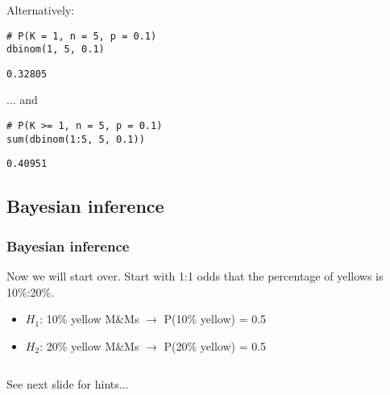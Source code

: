 \documentclass[11pt,containsverbatim,handout,xcolor=xelatex,dvipsnames,table]{beamer}
\begin{document}

\begin{frame}[fragile]
\frametitle{}

Alternatively: \\
\pause
{\footnotesize
\begin{Verbatim}[frame=single, formatcom=\color{blue}]
# P(K = 1, n = 5, p = 0.1) 
dbinom(1, 5, 0.1)
\end{Verbatim}
}
{\footnotesize
\begin{Verbatim}[frame=single, formatcom=\color{gray}]
0.32805
\end{Verbatim}
}

... and

\pause
{\footnotesize
\begin{Verbatim}[frame=single, formatcom=\color{blue}]
# P(K >= 1, n = 5, p = 0.1) 
sum(dbinom(1:5, 5, 0.1))
\end{Verbatim}
}
{\footnotesize
\begin{Verbatim}[frame=single, formatcom=\color{gray}]
0.40951
\end{Verbatim}
}


\end{frame}


\subsection{Bayesian inference}


\begin{frame}
\frametitle{Bayesian inference}

Now we will start over.  Start with 1:1 odds that the percentage of yellows is 10\%:20\%.

\begin{itemize}
\item $H_1$: 10\% yellow M\&Ms $\rightarrow$ P(10\% yellow) = 0.5
\item $H_2$: 20\% yellow M\&Ms $\rightarrow$ P(20\% yellow) = 0.5
\end{itemize}

\pause

$\:$ \\


\vfill

\begin{center}
{\footnotesize See next slide for hints...}
\end{center}

\end{frame}
\end{document}
